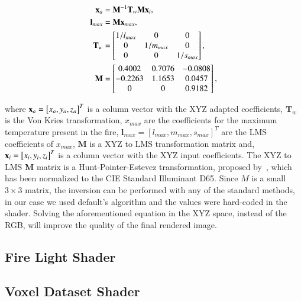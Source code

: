 \begin{equation}
\begin{split}
\mathbf{x}_a &= \mathbf{M}^{-1} \mathbf{T}_w \mathbf{M} \mathbf{x}_i, \\
\mathbf{l}_{max} &= \mathbf{M} \mathbf{x}_{max}, \\
\mathbf{T}_w &= 
\begin{bmatrix}
1 / l_{max} & 0 & 0\\
0 & 1 / m_{max} & 0\\
0 & 0 & 1 / s_{max}\\
\end{bmatrix}, \\
\mathbf{M} &= 
\begin{bmatrix}
0.4002 & 0.7076 & -0.0808\\
-0.2263 & 1.1653 & 0.0457\\
0 & 0 & 0.9182\\
\end{bmatrix},
\end{split}
\end{equation}

where $\mathbf{x}_a = \left[ x_a, y_a, z_a \right]^{T}$ is a column vector with the XYZ adapted coefficients, $\mathbf{T}_w$ is the Von Kries transformation, $x_{max}$ are the coefficients for the maximum temperature present in the fire,  $\mathbf{l}_{max} = \left[ l_{max}, m_{max}, s_{max} \right]^{T}$ are the LMS coefficients of $x_{max}$, $\mathbf{M}$ is a XYZ to LMS transformation matrix and, $\mathbf{x}_i = \left[ x_i, y_i, z_i \right]^{T}$ is a column vector with the XYZ input coefficients.
The XYZ to LMS $\mathbf{M}$ matrix is a Hunt-Pointer-Estevez transformation, proposed by~\cite{Hunt:1985}, which has been normalized to the CIE Standard Illuminant D65.
Since $M$ is a small $3 \times 3$ matrix, the inversion can be performed with any of the standard methods, in our case we used \Matlab default's algorithm and the values were hard-coded in the shader.
Solving the aforementioned equation in the XYZ space, instead of the RGB, will improve the quality of the final rendered image.

\subsection{Fire Light Shader}
\label{sec:fire_light_shader}


\subsection{Voxel Dataset Shader}
\label{sec:voxel_dataset_shader}